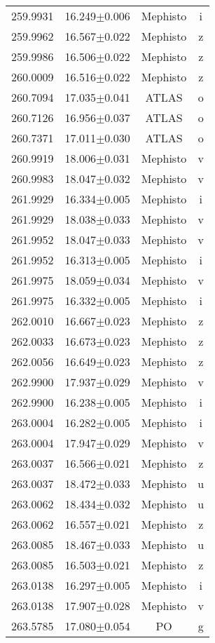 \begin{table}
\begin{tabular}{cccc}
259.9931 & 16.249$\pm$0.006 & Mephisto & i \\
259.9962 & 16.567$\pm$0.022 & Mephisto & z \\
259.9986 & 16.506$\pm$0.022 & Mephisto & z \\
260.0009 & 16.516$\pm$0.022 & Mephisto & z \\
260.7094 & 17.035$\pm$0.041 & ATLAS & o \\
260.7126 & 16.956$\pm$0.037 & ATLAS & o \\
260.7371 & 17.011$\pm$0.030 & ATLAS & o \\
260.9919 & 18.006$\pm$0.031 & Mephisto & v \\
260.9983 & 18.047$\pm$0.032 & Mephisto & v \\
261.9929 & 16.334$\pm$0.005 & Mephisto & i \\
261.9929 & 18.038$\pm$0.033 & Mephisto & v \\
261.9952 & 18.047$\pm$0.033 & Mephisto & v \\
261.9952 & 16.313$\pm$0.005 & Mephisto & i \\
261.9975 & 18.059$\pm$0.034 & Mephisto & v \\
261.9975 & 16.332$\pm$0.005 & Mephisto & i \\
262.0010 & 16.667$\pm$0.023 & Mephisto & z \\
262.0033 & 16.673$\pm$0.023 & Mephisto & z \\
262.0056 & 16.649$\pm$0.023 & Mephisto & z \\
262.9900 & 17.937$\pm$0.029 & Mephisto & v \\
262.9900 & 16.238$\pm$0.005 & Mephisto & i \\
263.0004 & 16.282$\pm$0.005 & Mephisto & i \\
263.0004 & 17.947$\pm$0.029 & Mephisto & v \\
263.0037 & 16.566$\pm$0.021 & Mephisto & z \\
263.0037 & 18.472$\pm$0.033 & Mephisto & u \\
263.0062 & 18.434$\pm$0.032 & Mephisto & u \\
263.0062 & 16.557$\pm$0.021 & Mephisto & z \\
263.0085 & 18.467$\pm$0.033 & Mephisto & u \\
263.0085 & 16.503$\pm$0.021 & Mephisto & z \\
263.0138 & 16.297$\pm$0.005 & Mephisto & i \\
263.0138 & 17.907$\pm$0.028 & Mephisto & v \\
263.5785 & 17.080$\pm$0.054 & PO & g \\

\end{tabular}
\end{table}
